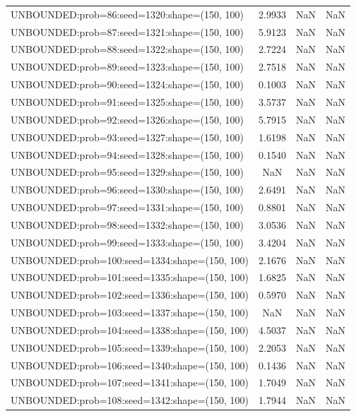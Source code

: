 \begin{longtable}{lccc}
UNBOUNDED:prob=86:seed=1320:shape=(150, 100)  &  2.9933 &   NaN &    NaN \\
UNBOUNDED:prob=87:seed=1321:shape=(150, 100)  &  5.9123 &   NaN &    NaN \\
UNBOUNDED:prob=88:seed=1322:shape=(150, 100)  &  2.7224 &   NaN &    NaN \\
UNBOUNDED:prob=89:seed=1323:shape=(150, 100)  &  2.7518 &   NaN &    NaN \\
UNBOUNDED:prob=90:seed=1324:shape=(150, 100)  &  0.1003 &   NaN &    NaN \\
UNBOUNDED:prob=91:seed=1325:shape=(150, 100)  &  3.5737 &   NaN &    NaN \\
UNBOUNDED:prob=92:seed=1326:shape=(150, 100)  &  5.7915 &   NaN &    NaN \\
UNBOUNDED:prob=93:seed=1327:shape=(150, 100)  &  1.6198 &   NaN &    NaN \\
UNBOUNDED:prob=94:seed=1328:shape=(150, 100)  &  0.1540 &   NaN &    NaN \\
UNBOUNDED:prob=95:seed=1329:shape=(150, 100)  &     NaN &   NaN &    NaN \\
UNBOUNDED:prob=96:seed=1330:shape=(150, 100)  &  2.6491 &   NaN &    NaN \\
UNBOUNDED:prob=97:seed=1331:shape=(150, 100)  &  0.8801 &   NaN &    NaN \\
UNBOUNDED:prob=98:seed=1332:shape=(150, 100)  &  3.0536 &   NaN &    NaN \\
UNBOUNDED:prob=99:seed=1333:shape=(150, 100)  &  3.4204 &   NaN &    NaN \\
UNBOUNDED:prob=100:seed=1334:shape=(150, 100) &  2.1676 &   NaN &    NaN \\
UNBOUNDED:prob=101:seed=1335:shape=(150, 100) &  1.6825 &   NaN &    NaN \\
UNBOUNDED:prob=102:seed=1336:shape=(150, 100) &  0.5970 &   NaN &    NaN \\
UNBOUNDED:prob=103:seed=1337:shape=(150, 100) &     NaN &   NaN &    NaN \\
UNBOUNDED:prob=104:seed=1338:shape=(150, 100) &  4.5037 &   NaN &    NaN \\
UNBOUNDED:prob=105:seed=1339:shape=(150, 100) &  2.2053 &   NaN &    NaN \\
UNBOUNDED:prob=106:seed=1340:shape=(150, 100) &  0.1436 &   NaN &    NaN \\
UNBOUNDED:prob=107:seed=1341:shape=(150, 100) &  1.7049 &   NaN &    NaN \\
UNBOUNDED:prob=108:seed=1342:shape=(150, 100) &  1.7944 &   NaN &    NaN \\

\end{longtable}
